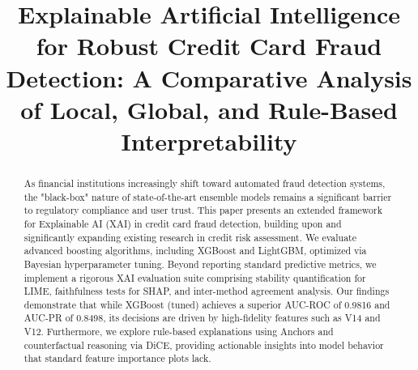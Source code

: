 \documentclass[conference]{IEEEtran}
\begin{document}
\title{Explainable Artificial Intelligence for Robust Credit Card Fraud Detection: A Comparative Analysis of Local, Global, and Rule-Based Interpretability}

\author{
\and
{}
\and
{}
\and
{}
\and
{}
}

\maketitle

\begin{abstract}
As financial institutions increasingly shift toward automated fraud detection systems, the "black-box" nature of state-of-the-art ensemble models remains a significant barrier to regulatory compliance and user trust. This paper presents an extended framework for Explainable AI (XAI) in credit card fraud detection, building upon and significantly expanding existing research in credit risk assessment. We evaluate advanced boosting algorithms, including XGBoost and LightGBM, optimized via Bayesian hyperparameter tuning. Beyond reporting standard predictive metrics, we implement a rigorous XAI evaluation suite comprising stability quantification for LIME, faithfulness tests for SHAP, and inter-method agreement analysis. Our findings demonstrate that while XGBoost (tuned) achieves a superior AUC-ROC of 0.9816 and AUC-PR of 0.8498, its decisions are driven by high-fidelity features such as V14 and V12. Furthermore, we explore rule-based explanations using Anchors and counterfactual reasoning via DiCE, providing actionable insights into model behavior that standard feature importance plots lack.
\end{abstract}
\end{document}
